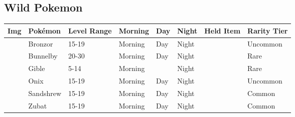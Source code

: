\subsection{Wild Pokemon}%
\label{subsec:WildPokemon}%
\begin{longtable}{||l l l l l l l l||}%
\hline%
Img&Pokémon&Level Range&Morning&Day&Night&Held Item&Rarity Tier\\%
\hline%
\endhead%
\hline%
&Bronzor&15{-}19&Morning&Day&Night&&Uncommon\\%
\hline%
&Bunnelby&20{-}30&Morning&Day&Night&&Rare\\%
\hline%
&Gible&5{-}14&Morning&&Night&&Rare\\%
\hline%
&Onix&15{-}19&Morning&Day&Night&&Uncommon\\%
\hline%
&Sandshrew&15{-}19&Morning&Day&Night&&Common\\%
\hline%
&Zubat&15{-}19&Morning&Day&Night&&Common\\%
\hline%
\end{longtable}